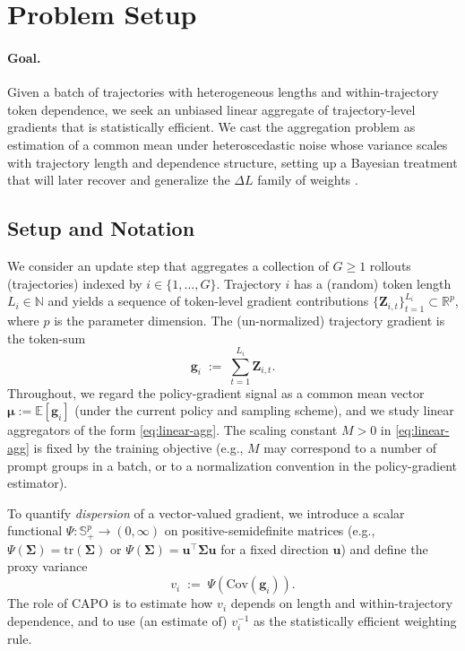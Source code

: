 \section{Problem Setup}\label{sec:setup}

\paragraph{Goal.}
Given a batch of trajectories with heterogeneous lengths and within-trajectory token dependence, we seek an unbiased linear aggregate of trajectory-level gradients that is statistically efficient. We cast the aggregation problem as estimation of a common mean under heteroscedastic noise whose variance scales with trajectory length and dependence structure, setting up a Bayesian treatment that will later recover and generalize the $\Delta L$ family of weights \citep{he2025deltal}.

\subsection{Setup and Notation}\label{subsec:setup-notation}

We consider an update step that aggregates a collection of $G\ge 1$ rollouts (trajectories) indexed by $i\in\{1,\dots,G\}$.
Trajectory $i$ has a (random) token length $L_i\in\mathbb{N}$ and yields a sequence of token-level gradient contributions
$\{\boldsymbol{Z}_{i,t}\}_{t=1}^{L_i}\subset\mathbb{R}^{p}$, where $p$ is the parameter dimension.
The (un-normalized) trajectory gradient is the token-sum
\begin{equation}
  \boldsymbol{g}_i \;:=\; \sum_{t=1}^{L_i}\boldsymbol{Z}_{i,t}.
  \label{eq:def_traj_grad_sum}
\end{equation}
Throughout, we regard the policy-gradient signal as a common mean vector $\boldsymbol{\mu}:=\mathbb{E}[\boldsymbol{g}_i]$ (under the current policy and sampling scheme),
and we study linear aggregators of the form \eqref{eq:linear-agg}.
The scaling constant $M>0$ in \eqref{eq:linear-agg} is fixed by the training objective (e.g., $M$ may correspond to a number of prompt groups in a batch, or to a normalization convention in the policy-gradient estimator).

To quantify \emph{dispersion} of a vector-valued gradient, we introduce a scalar functional
$\Psi:\mathbb{S}_{+}^{p}\to(0,\infty)$ on positive-semidefinite matrices (e.g., $\Psi(\boldsymbol{\Sigma})=\mathrm{tr}(\boldsymbol{\Sigma})$ or $\Psi(\boldsymbol{\Sigma})=\bm{u}^\top\boldsymbol{\Sigma}\bm{u}$ for a fixed direction $\bm{u}$)
and define the proxy variance
\begin{equation}
  v_i \;:=\; \Psi\!\left(\mathrm{Cov}(\boldsymbol{g}_i)\right).
  \label{eq:def_vi}
\end{equation}
The role of CAPO is to estimate how $v_i$ depends on length and within-trajectory dependence, and to use (an estimate of) $v_i^{-1}$ as the statistically efficient weighting rule.

